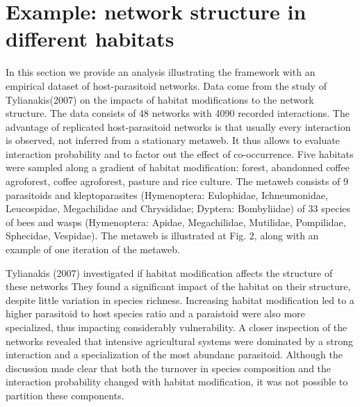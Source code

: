 \documentclass[12pt]{article}
\begin{document}

\newpage
\section*{Example: network structure in different habitats}

In this section we provide an analysis illustrating the framework with an
empirical dataset of host-parasitoid networks. Data come from the study of
Tylianakis(2007) on the impacts of habitat modifications to the network
structure. The data consists of 48 networks with 4090 recorded interactions. The
advantage of replicated host-parasitoid networks is that usually every
interaction is observed, not inferred from a stationary metaweb. It thus allows
to evaluate interaction probability and to factor out the effect of
co-occurrence. Five habitats were sampled along a gradient of habitat
modification: forest, abandonned coffee agroforest, coffee agroforest, pasture
and rice culture. The metaweb consists of 9 parasitoids and kleptoparasites
(Hymenoptera: Eulophidae, Ichneumonidae, Leucospidae, Megachilidae and
Chrysididae; Dyptera: Bombyliidae) of 33 species of bees and wasps (Hymenoptera:
Apidae, Megachilidae, Mutilidae, Pompilidae, Sphecidae, Vespidae). The metaweb
is illustrated at Fig. 2, along with an example of one iteration of the metaweb.

Tylianakis (2007) investigated if habitat modification affects the structure of
these networks They found a significant impact of the habitat on their
structure, despite little variation in species richness. Increasing habitat
modification led to a higher parasitoid to host species ratio and a paraistoid
were also more specialized, thus impacting considerably vulnerability. A closer
inspection of the networks revealed that intensive agricultural systems were
dominated by a strong interaction and a specialization of the most abundanc
parasitoid. Although the discussion made clear that both the turnover in species
composition and the interaction probability changed with habitat modification,
it was not possible to partition these components.
 
\end{document}
